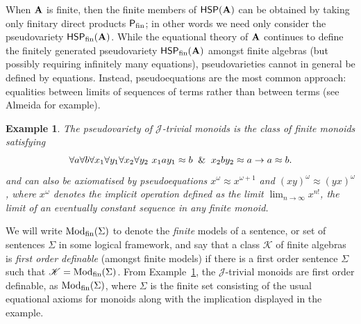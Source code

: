 \documentclass[reqno]{amsart}
\theoremstyle{plain}
\newtheorem{example}[thm]{Example}
\theoremstyle{definition}
\newcommand{\Mod}{\operatorname{Mod}}
\begin{document}
  When ${\bf A}$ is finite, then the finite members of $\mathsf{HSP}({\bf A})$ can be obtained by taking only finitary direct products $\mathsf{P}_{\rm fin}$; in other words we need only consider the pseudovariety $\mathsf{HSP}_{\rm fin}({\bf A})$. 
While the equational theory of ${\bf A}$ continues to define the finitely generated pseudovariety $\mathsf{HSP}_{\rm fin}({\bf A})$ amongst finite algebras (but possibly requiring infinitely many equations), pseudovarieties cannot in general be defined by equations.  
Instead, pseudoequations are the most common approach: equalities between limits of sequences of terms rather than between terms (see Almeida \cite{alm} for example).
  \begin{example}\label{eg:Jtrivial}
  The pseudovariety of $\mathscr{J}$-trivial monoids is the class of finite monoids satisfying 
  \[
\forall a\forall b\forall x_1\forall y_1\forall x_2\forall y_2\ x_1ay_1\approx b\And x_2by_2\approx a\rightarrow a\approx b.
\]
and can also be axiomatised by pseudoequations $x^\omega\approx x^{\omega+1}$ and $(xy)^\omega\approx (yx)^\omega$, where $x^\omega$ denotes the implicit operation defined as the limit $\lim_{n\to\infty}x^{n!}$, the limit of an eventually constant sequence in any finite monoid.
  \end{example}
We will write $\Mod_{\rm fin}(\Sigma)$ to denote the \emph{finite} models of a sentence, or set of sentences $\Sigma$ in some logical framework, and say that a class $\mathscr{K}$ of finite algebras is \emph{first order definable} (amongst finite models) if there is a first order sentence $\Sigma$ such that $\mathscr{K}=\Mod_{\rm fin}(\Sigma)$.
From Example~\ref{eg:Jtrivial}, the $\mathscr{J}$-trivial monoids are first order definable, as $\Mod_{\rm fin}(\Sigma)$, where $\Sigma$ is the finite set consisting of the usual equational axioms for monoids along with the implication displayed in the example.
\end{document}
